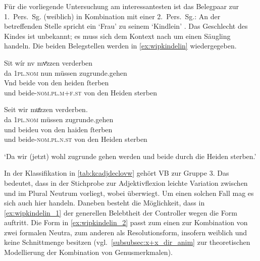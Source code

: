 Für die vorliegende Untersuchung am interessantesten ist das Belegpaar zur 1.\
Pers.\ Sg. (weiblich) in Kombination mit einer 2.\ Pers.\ Sg.: An der
betreffenden Stelle spricht ein \norm{wīp} `Frau' zu seinem
 `Kindlein' \autocite[910--932]{schroeder1895}. Das
Geschlecht des Kindes ist unbekannt; es muss sich dem Kontext nach um einen
Säugling handeln. Die beiden Belegstellen werden in \cref{ex:wipkindelin}
wiedergegeben.

\begin{exe}
\ex \label{ex:wipkindelin}
	\begin{xlist}
	\ex \label{ex:wipkindelin_1}
		\begin{taggedline}{\parencites[\pno~5rb,33--34]{kc:VB}}
		\gll Sit wír nv mvͤzzen verderben \\
			da \textsc{1pl\tsub{\SF/\SX}.nom} nun müssen zugrunde.gehen \\
	\sn \gll Vnd beide von den heiden ſterben \\
			und beide-\textsc{nom.pl.m+f\tsub{\SF/\SX}.st} von den Heiden
				sterben \\
		\end{taggedline}
		
	\ex \label{ex:wipkindelin_2}
		\gll Seit wir muͤzzen verderben. \\
			da \textsc{1pl\tsub{\SF/\SX}.nom} müssen zugrunde.gehen \\
	\sn \gll und beideu von den haiden ſterben \\
			und beide-\textsc{nom.pl.n\tsub{\SF/\SX}.st} von den Heiden
				sterben \\
		\begin{taggedline}{\parencites[\pno~4vb,57--58]{kc:B1}[vgl. abweichend][931--932]{schroeder1895}}
		\trans `Da wir (jetzt) wohl zugrunde gehen werden und beide durch die Heiden sterben.'
		\end{taggedline}
	\end{xlist}
\end{exe}

In der Klassifikation in \cref{tab:kcadjdeclovw} gehört VB zur
Gruppe 3. Das bedeutet, dass in der Stichprobe zur Adjektiv\-flexion leichte
Variation zwischen  und \norm{-e} im Plural Neutrum vorliegt, wobei
\norm{-iu} überwiegt. Um einen solchen Fall mag es sich auch hier handeln.
Daneben besteht die Möglichkeit, dass in \cref{ex:wipkindelin_1} der generellen
Belebtheit der Controller wegen die Form \lit{beide} auftritt. Die Form
\lit{beideu} in \cref{ex:wipkindelin_2} passt zum einen zur Kombination von
zwei formalen Neutra, zum anderen als Resolutionsform, insofern weiblich und
\q{unspezifisch} keine Schnittmenge besitzen
(vgl.~\cref{subsubsec:x+x_dir_anim} zur theoretischen Modellierung der
Kombination von Genusmerkmalen).

